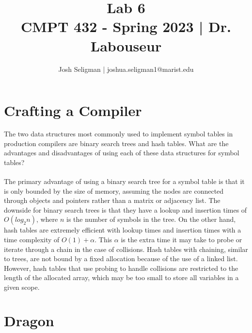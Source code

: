 \documentclass[letterpaper, 10pt, DIV=13]{scrartcl}
\title {
	\normalfont
	\huge{Lab 6} \\
	\vspace{10pt}
	\large{CMPT 432 - Spring 2023 | Dr. Labouseur}
}
\author{\normalfont Josh Seligman | joshua.seligman1@marist.edu}
\numberwithin{equation}{section}
\numberwithin{figure}{section}
\numberwithin{table}{section}
\begin{document}
\maketitle

\section{Crafting a Compiler}
The two data structures most commonly used to implement symbol
tables in production compilers are binary search trees and hash tables.
What are the advantages and disadvantages of using each of these data
structures for symbol tables?
\\ \\
The primary advantage of using a binary search tree for a symbol table is that it 
is only bounded by the size of memory, assuming the nodes are connected through 
objects and pointers rather than a matrix or adjacency list. The downside for binary
search trees is that they have a lookup and insertion times of $O(log_2n)$, where
$n$ is the number of symbols in the tree. On the other hand, hash tables are extremely
efficient with lookup times and insertion times with a time complexity of
$O(1) + \alpha$. This $\alpha$ is the extra time it may take to probe or iterate
through a chain in the case of collisions. Hash tables with chaining, similar to
trees, are not bound by a fixed allocation because of the use of a linked list.
However, hash tables that use probing to handle collisions are restricted to the
length of the allocated array, which may be too small to store all variables in a given scope.

\section{Dragon}
\end{document}
